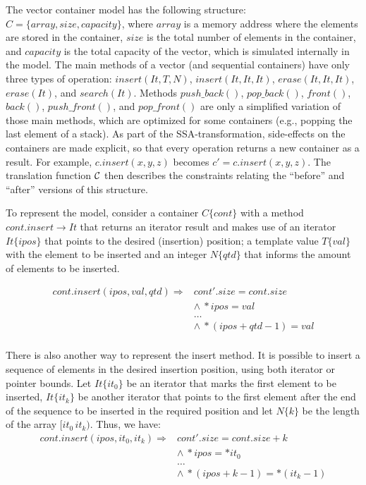 \documentclass[a4paper]{llncs}
\begin{document}
The vector container model has the following structure:
$C = \{ array, size, capacity\}$,
where $array$ is a memory address where the elements are stored in the container,
$size$ is the total number of elements in the container, and $capacity$
is the total capacity of the vector, which is simulated internally in the model.
The main methods of a vector (and sequential containers) have only
three types of operation: $\mathit{insert\left(It, T, N\right)}$,
$\mathit{insert\left(It, It, It\right)}$, $\mathit{erase\left(It, It, It\right)}$,
$\mathit{erase\left(It\right)}$, and $\mathit{search\left(It\right)}$.
Methods $push\_back\left(\right)$, $pop\_back\left(\right)$, $front\left(\right)$,
$back\left(\right)$, $push\_front\left(\right)$, and $pop\_front\left(\right)$ are only
a simplified variation of those main methods, which are optimized for some containers
(e.g., popping the last element of a stack).
As part of the SSA-transformation, side-effects on the containers are made explicit,
so that every operation returns a new container as a result. For example,
$\mathit{c.insert\left(x,y,z\right)}$ becomes $\mathit{c' = c.insert\left(x,y,z\right)}$.
The translation function $\cal C$ then describes the constraints relating the ``before''
and ``after'' versions of this structure.

To represent the model, consider a container $C\{cont\}$ with a
method $cont.insert \rightarrow It$ that returns an iterator result and
makes use of an iterator $It\{ipos\}$ that points to the desired
(insertion) position; a template value $T\{val\}$ with the element
to be inserted and an integer $N\{qtd\}$ that informs the amount
of elements to be inserted.

\[\begin{array}{ll}
cont.insert(ipos, val, qtd) \Longrightarrow & cont'.size = cont.size \\
  & \wedge \: *ipos = val \\
  & \ldots \\
  & \wedge \: *(ipos + qtd - 1) = val \\
\end{array}\]

There is also another way to represent the insert method.
It is possible to insert a sequence of elements in the desired
insertion position, using both iterator or pointer bounds.
Let $It\{it_0\}$ be an iterator that marks the first element
to be inserted, $It\{it_k\}$ be another iterator that
points to the first element after the end of the sequence to be inserted
in the required position and let $N\{k\}$ be the length of the array $[it_0\, it_k)$.
Thus, we have:
%
\[\begin{array}{ll}
cont.insert(ipos, it_0, it_k) \Longrightarrow & cont'.size = cont.size + k\\
  & \wedge \: *ipos = *it_0 \\
  & \ldots \\
  & \wedge \: *(ipos + k - 1) = *(it_k - 1)
\end{array}\]
\end{document}
